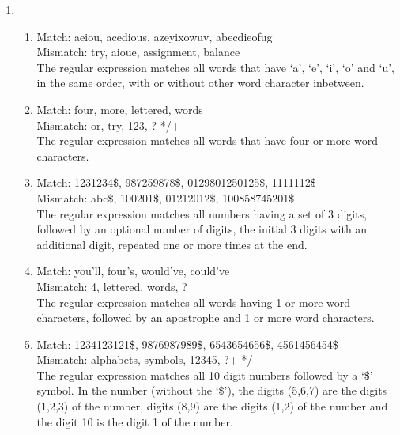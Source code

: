 \documentclass[11pt,a4paper]{article}
\begin{document}
\begin{enumerate}
\vspace{0.5em}

\item{
\begin{enumerate}
\item {Match: aeiou, acedious, azeyixowuv, abecdieofug \\
Mismatch: try, aioue, assignment, balance
}\\
The regular expression matches all words that have `a', `e', `i', `o' and `u', in the same order, with or without other word character inbetween.
\item {Match: four, more, lettered, words \\
Mismatch: or, try, 123, ?-*/+
}\\
The regular expression matches all words that have four or more word characters.
\item {Match: 1231234\$, 987259878\$, 0129801250125\$, 1111112\$ \\
Mismatch: abc\$, 100201\$, 01212012\$, 100858745201\$
}\\
The regular expression matches all numbers having a set of 3 digits, followed by an optional number of digits, the initial 3 digits with an additional digit, repeated one or more times at the end.
\item {Match: you'll, four's, would've, could've\\
Mismatch: 4, lettered, words, ?
}\\ 
The regular expression matches all words having 1 or more word characters, followed by an apostrophe and 1 or more word characters.
\item {Match: 1234123121\$, 9876987989\$, 6543654656\$, 4561456454\$ \\
Mismatch: alphabets, symbols, 12345, ?+-*/
}\\
The regular expression matches all 10 digit numbers followed by a `\$' symbol. In the number (without the `\$'), the digits (5,6,7) are the digits (1,2,3) of the number, digits (8,9) are the digits (1,2) of the number and the digit 10 is the digit 1 of the number.
\end{enumerate}}

\break


\end{enumerate}
\end{document}

